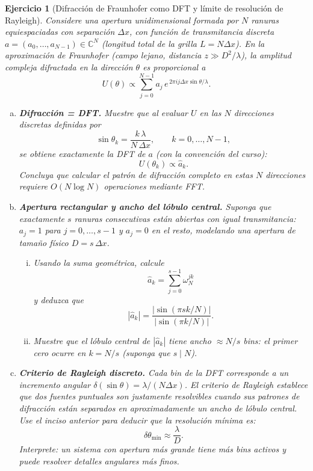 \documentclass[12pt]{article}
\newtheorem{exercise}{Ejercicio}
\begin{document}
\begin{exercise}[Difracción de Fraunhofer como DFT y límite de resolución de Rayleigh]
Considere una apertura unidimensional formada por $N$ ranuras equiespaciadas con separación $\Delta x$,
con función de transmitancia discreta $a = (a_0, \ldots, a_{N-1}) \in \mathbb{C}^N$ (longitud total de la grilla $L = N\Delta x$).
En la aproximación de Fraunhofer (campo lejano, distancia $z \gg D^2/\lambda$), la amplitud compleja difractada en la dirección $\theta$ es proporcional a
\[
U(\theta) \propto \sum_{j=0}^{N-1} a_j\, e^{\,2\pi i j \Delta x \sin\theta / \lambda}.
\]
\begin{enumerate}[(a)]
\item \textbf{Difracción = DFT.}
Muestre que al evaluar $U$ en las $N$ direcciones discretas definidas por
\[
\sin\theta_k = \frac{k\,\lambda}{N\,\Delta x}, \qquad k = 0, \ldots, N-1,
\]
se obtiene exactamente la DFT de $a$ (con la convención del curso):
\[
U(\theta_k) \propto \hat{a}_k.
\]
Concluya que calcular el patrón de difracción completo en estas $N$ direcciones requiere $O(N \log N)$ operaciones mediante FFT.

\item \textbf{Apertura rectangular y ancho del lóbulo central.}
Suponga que exactamente $s$ ranuras consecutivas están abiertas con igual transmitancia:
$a_j = 1$ para $j = 0, \ldots, s-1$ y $a_j = 0$ en el resto, modelando una apertura de tamaño físico $D = s\,\Delta x$.
\begin{enumerate}[i.]
\item Usando la suma geométrica, calcule
\[
\hat{a}_k = \sum_{j=0}^{s-1} \omega_N^{jk}
\]
y deduzca que
\[
|\hat{a}_k| = \frac{|\sin(\pi s k / N)|}{|\sin(\pi k / N)|}.
\]
\item Muestre que el lóbulo central de $|\hat{a}_k|$ tiene ancho $\approx N/s$ \emph{bins}: el primer cero ocurre en $k = N/s$ (suponga que $s \mid N$).
\end{enumerate}

\item \textbf{Criterio de Rayleigh discreto.}
Cada bin de la DFT corresponde a un incremento angular $\delta(\sin\theta) = \lambda/(N\Delta x)$.
El criterio de Rayleigh establece que dos fuentes puntuales son justamente resolvibles cuando sus patrones de difracción están separados en aproximadamente un ancho de lóbulo central.
Use el inciso anterior para deducir que la resolución mínima es:
\[
\delta\theta_{\min} \approx \frac{\lambda}{D}.
\]
Interprete: un sistema con apertura más grande tiene más \emph{bins} activos y puede resolver detalles angulares más finos.


\end{enumerate}
\end{exercise}
\end{document}
